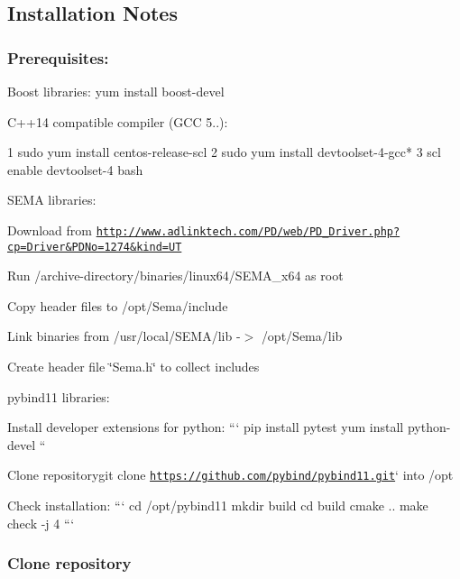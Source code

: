 \subsection*{Installation Notes}

\subsubsection*{Prerequisites\+:}


\begin{DoxyItemize}
\item Boost libraries\+: {\ttfamily yum install boost-\/devel}
\item C++14 compatible compiler (G\+CC 5..)\+: 
\begin{DoxyCode}
1 sudo yum install centos-release-scl
2 sudo yum install devtoolset-4-gcc*
3 scl enable devtoolset-4 bash
\end{DoxyCode}

\item S\+E\+MA libraries\+:
\begin{DoxyEnumerate}
\item Download from \href{http://www.adlinktech.com/PD/web/PD_Driver.php?cp=Driver&PDNo=1274&kind=UT}{\tt http\+://www.\+adlinktech.\+com/\+P\+D/web/\+P\+D\+\_\+\+Driver.\+php?cp=\+Driver\&\+P\+D\+No=1274\&kind=\+UT}
\item Run {\ttfamily /archive-\/directory/binaries/linux64/\+S\+E\+M\+A\+\_\+x64} as root
\item Copy header files to {\ttfamily /opt/\+Sema/include}
\item Link binaries from {\ttfamily /usr/local/\+S\+E\+M\+A/lib} -\/$>$ {\ttfamily /opt/\+Sema/lib}
\item Create header file \char`\"{}\+Sema.\+h\char`\"{} to collect includes
\end{DoxyEnumerate}
\item pybind11 libraries\+:
\begin{DoxyEnumerate}
\item Install developer extensions for python\+: ``` pip install pytest yum install python-\/devel ``{\ttfamily }
\item {\ttfamily Clone repository}git clone \href{https://github.com/pybind/pybind11.git}{\tt https\+://github.\+com/pybind/pybind11.\+git}` into /opt
\item Check installation\+: ``` cd /opt/pybind11 mkdir build cd build cmake .. make check -\/j 4 ``` \subsubsection*{Clone repository}
\end{DoxyEnumerate}


\end{DoxyItemize}
